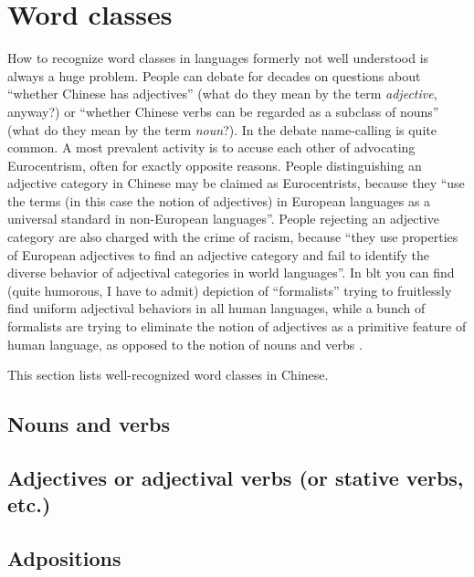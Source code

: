 \section{Word classes}\label{sec:word-class-intro}

How to recognize word classes in languages formerly not well understood is always a huge problem.
People can debate for decades on questions about ``whether Chinese has adjectives'' (what do they mean 
by the term \emph{adjective}, anyway?) or ``whether Chinese verbs can be regarded as a subclass of nouns''
(what do they mean by the term \emph{noun}?). In the debate name-calling is quite common. 
A most prevalent activity is to accuse each other of 
advocating Eurocentrism, often for exactly opposite reasons. People distinguishing an adjective 
category in Chinese may be claimed as Eurocentrists, because they ``use the terms (in this case 
the notion of adjectives) in European languages as a universal standard in non-European languages''.
People rejecting an adjective category are also charged with the crime of racism, because 
``they use properties of European adjectives to find an adjective category and fail to identify 
the diverse behavior of adjectival categories in world languages''. In \ac{blt} you can find 
(quite humorous, I have to admit) depiction of ``formalists'' trying to fruitlessly find uniform adjectival 
behaviors in all human languages, while a bunch of formalists are trying to eliminate the 
notion of adjectives as a primitive feature of human language, as opposed to the notion of nouns and verbs \citep{Mitrovi2020}.

This section lists well-recognized word classes in Chinese. %

\subsection{Nouns and verbs}

\subsection{Adjectives or adjectival verbs (or stative verbs, etc.)}

\subsection{Adpositions}


